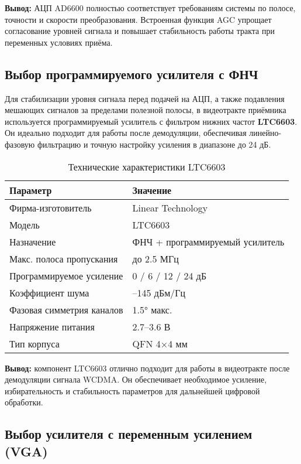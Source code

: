 \documentclass[a4paper,12pt]{article}
\begin{document}
\textbf{Вывод:} АЦП AD6600 полностью соответствует требованиям системы по полосе, точности и скорости преобразования. Встроенная функция AGC упрощает согласование уровней сигнала и повышает стабильность работы тракта при переменных условиях приёма.


\subsection{Выбор программируемого усилителя с ФНЧ}

Для стабилизации уровня сигнала перед подачей на АЦП, а также подавления мешающих сигналов за пределами полезной полосы, в видеотракте приёмника используется программируемый усилитель с фильтром нижних частот \textbf{LTC6603}. Он идеально подходит для работы после демодуляции, обеспечивая линейно-фазовую фильтрацию и точную настройку усиления в диапазоне до 24 дБ.

\begin{table}[H]
\centering
\caption{Технические характеристики LTC6603}
\begin{tabular}{|l|l|}
\hline
\textbf{Параметр} & \textbf{Значение} \\ \hline
Фирма-изготовитель & Linear Technology \\ \hline
Модель & LTC6603 \\ \hline
Назначение & ФНЧ + программируемый усилитель \\ \hline
Макс. полоса пропускания & до 2.5 МГц \\ \hline
Программируемое усиление & 0 / 6 / 12 / 24 дБ \\ \hline
Коэффициент шума & --145 дБм/Гц \\ \hline
Фазовая симметрия каналов & 1.5° макс. \\ \hline
Напряжение питания & 2.7–3.6 В \\ \hline
Тип корпуса & QFN 4×4 мм \\ \hline
\end{tabular}
\end{table}

\textbf{Вывод:} компонент LTC6603 отлично подходит для работы в видеотракте после демодуляции сигнала WCDMA. Он обеспечивает необходимое усиление, избирательность и стабильность параметров для дальнейшей цифровой обработки.



\subsection{Выбор усилителя с переменным усилением (VGA)}
\end{document}
